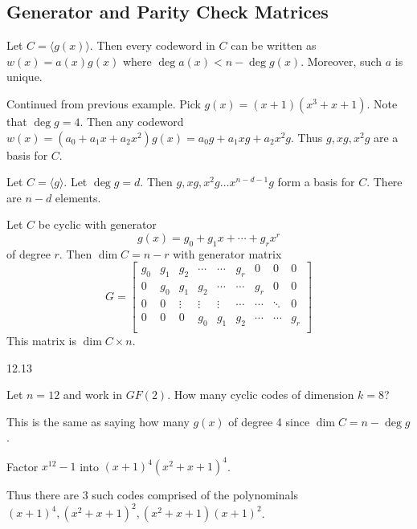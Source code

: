 \documentclass{article}
\begin{document}
\subsection{Generator and Parity Check Matrices}
\begin{theorem}
  Let \( C = \langle g(x) \rangle\).
  Then every codeword in \( C \) can be written as \( w(x) = a(x)g(x) \) where \( \deg a(x) < n - \deg g(x) \). Moreover, such \( a  \) is unique.
\end{theorem}
\begin{example}
  Continued from previous example. Pick \( g(x) = (x+1)(x^3+x+1) \). Note that \( \deg g = 4 \). Then any codeword \( w(x) = (a_0 + a_1x + a_2x^2)g(x) = a_0g + a_1xg + a_2x^2g \). Thus \( g, xg, x^2g \) are a basis for \( C \).
\end{example}
\begin{theorem}
  Let \( C = \langle g \rangle \). Let \( \deg g = d \).  Then \( g, xg, x^2g \dots x^{n-d-1}g  \) form a basis for \( C  \). There are \( n-d  \) elements.
\end{theorem}
\begin{theorem}\label{foo}
  Let \( C  \) be cyclic with generator \[
    g(x) = g_0 + g_1x + \cdots  + g_rx^r
  \] of degree \( r  \). Then \( \dim C = n - r \) with generator matrix \[
    G =
    \begin{bmatrix}
      g_0 & g_1 & g_2    & \cdots & \cdots & g_r    & 0      & 0      & 0   \\
      0   & g_0 & g_1    & g_2    & \cdots & \cdots & g_r    & 0      & 0   \\
      0   & 0   & \vdots & \vdots & \vdots & \cdots & \cdots & \ddots & 0   \\
      0   & 0   & 0      & g_0    & g_1    & g_2    & \cdots & \cdots & g_r \\
    \end{bmatrix}
  \]
  This matrix is \( \dim C \times n \).
\end{theorem}
\begin{example}
  12.13
\end{example}
\begin{example}
  Let \( n=12 \) and work in \( GF(2) \). How many cyclic codes of dimension \( k=8 \)?

  This is the same as saying how many \( g(x) \) of degree 4 since \( \dim C = n - \deg g \).

  Factor \( x^{12} - 1 \) into \( (x+1)^4(x^2+x+1)^4 \).

  Thus there are 3 such codes comprised of the polynominals \( (x+1)^4, (x^2+x+1)^2, (x^2+x+1)(x+1)^2 \).
\end{example}
\end{document}
